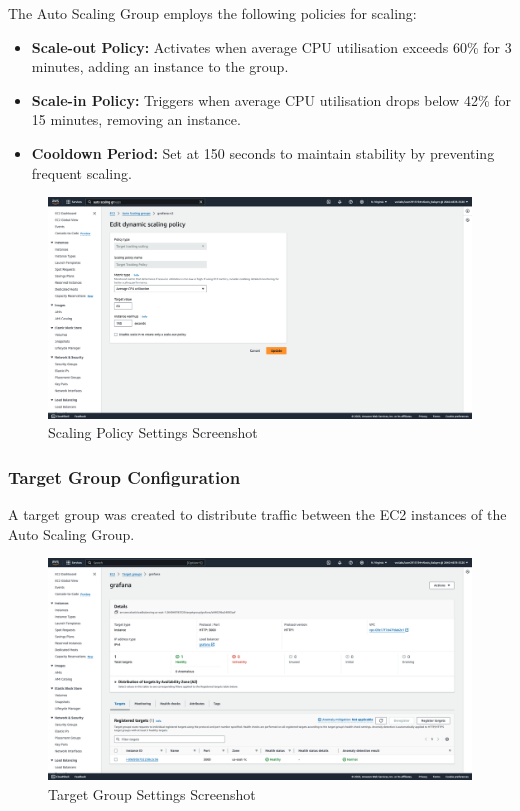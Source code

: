 \documentclass[12pt,oneside]{book} %
\begin{document}
The Auto Scaling Group employs the following policies for scaling:
\begin{itemize}
    \item \textbf{Scale-out Policy:} Activates when average CPU utilisation exceeds 60\% for 3 minutes, adding an instance to the group.
    \item \textbf{Scale-in Policy:} Triggers when average CPU utilisation drops below 42\% for 15 minutes, removing an instance.
    \item \textbf{Cooldown Period:} Set at 150 seconds to maintain stability by preventing frequent scaling.
\end{itemize}

\begin{figure}[H]
    \centering
    \includegraphics[width=1\linewidth]{images/scaling-policy.png}
    \caption{Scaling Policy Settings Screenshot}\label{fig:scaling-policy-settings}
\end{figure}

\subsubsection{Target Group Configuration}

A target group was created to distribute traffic between the EC2 instances of
the Auto Scaling Group. 

\begin{figure}[H]
    \centering
    \includegraphics[width=1\linewidth]{images/target-group.png}
    \caption{Target Group Settings Screenshot}\label{fig:target-group-settings}
\end{figure}
\end{document}
